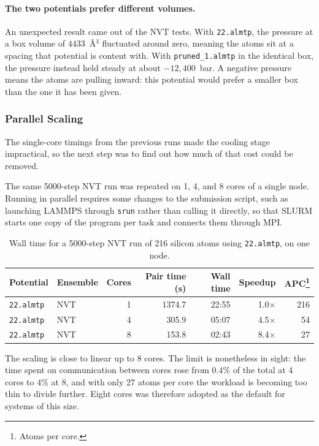 \documentclass{article}
\begin{document}
\paragraph{The two potentials prefer different volumes.}
An unexpected result came out of the NVT tests. With \texttt{22.almtp}, the pressure at a box volume of $4433$~\AA$^3$ fluctuated around zero, meaning the atoms sit at a spacing that potential is content with. With \texttt{pruned\_1.almtp} in the identical box, the pressure instead held steady at about $-12{,}400$~bar. A negative pressure means the atoms are pulling inward: this potential would prefer a smaller box than the one it has been given.

\subsubsection{Parallel Scaling}
The single-core timings from the previous runs made the cooling stage impractical, so the next step was to find out how much of that cost could be removed.

The same 5000-step NVT run was repeated on 1, 4, and 8 cores of a single node. Running in parallel requires some changes to the submission script, such as launching LAMMPS through \texttt{srun} rather than calling it directly, so that SLURM starts one copy of the program per task and connects them through MPI.


\begin{table}[H]
\centering
\small
\begin{tabular}{l|l|r|r|r|r|r}
\toprule
Potential & Ensemble & Cores & Pair time (s) & Wall time & Speedup & APC\footnote{Atoms per core.} \\
\midrule
\texttt{22.almtp}  & NVT & 1 & 1374.7 & 22:55 & 1.0$\times$ & 216 \\
\texttt{22.almtp}  & NVT & 4 & 305.9  & 05:07 & 4.5$\times$ & 54 \\
\texttt{22.almtp}  & NVT & 8 & 153.8  & 02:43 & 8.4$\times$ & 27 \\
\bottomrule
\end{tabular}
\caption{Wall time for a 5000-step NVT run of 216 silicon atoms using \texttt{22.almtp}, on one node.}
\label{tab:scaling}
\end{table}

The scaling is close to linear up to 8 cores. The limit is nonetheless in sight: the time spent on communication between cores rose from $0.4\%$ of the total at 4 cores to $4\%$ at 8, and with only 27 atoms per core the workload is becoming too thin to divide further. Eight cores was therefore adopted as the default for systems of this size.
\end{document}
